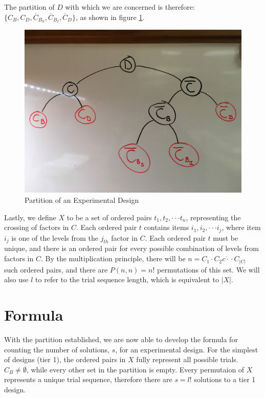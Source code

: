 The partition of $D$ with which we are concerned is therefore: $\{C_B, C_D, \overline{C}_{B_S}, \overline{C}_{B_I}, \overline{C}_D\}$, as shown in figure \ref{fig:partition}.

\begin{figure}
\centering
\centerline{\includegraphics[origin=c,width=12cm]{../figures/partition.jpg}}
\caption{Partition of an Experimental Design}
\label{fig:partition}
\end{figure}

Lastly, we define $X$ to be a set of ordered pairs $t_1, t_2, \cdot\cdot\cdot t_n$, representing the crossing of factors in $C$. Each ordered pair $t$ contains items $i_1, i_2, \cdot\cdot\cdot i_j$, where item $i_j$ is one of the levels from the $j_{th}$ factor in $C$. Each ordered pair $t$ must be unique, and there is an ordered pair for every possible combination of levels from factors in $C$. By the multiplication principle, there will be $n = C_1 \cdot C_2 c\dot\cdot\cdot C_{|C|}$ such ordered pairs, and there are $P(n, n) = n!$ permutations of this set. We will also use $l$ to refer to the trial sequence length, which is equivalent to $|X|$.


\section{Formula}

With the partition established, we are now able to develop the formula for counting the number of solutions, $s$, for an experimental design. For the simplest of designs (tier 1), the ordered pairs in $X$ fully represent all possible trials. $C_B \neq \emptyset$, while every other set in the partition is empty. Every permutaion of $X$ represents a unique trial sequence, therefore there are $s = l!$ solutions to a tier 1 design.

